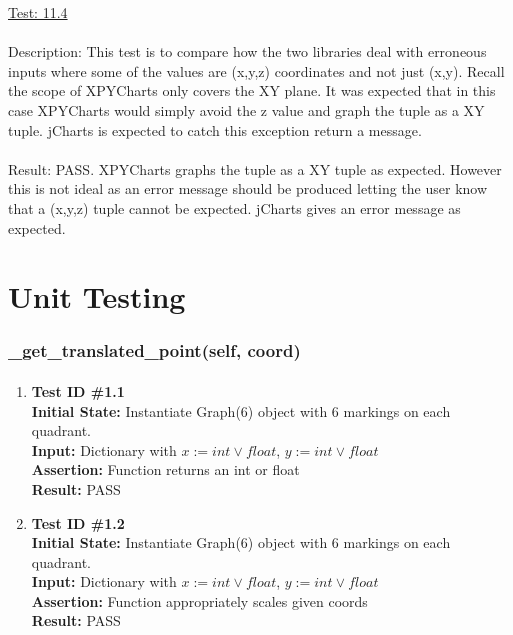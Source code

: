 \documentclass[12pt, titlepage]{article}
\begin{document}
\underline{Test: 11.4}\\\\\label{sec:11.4}
Description: This test is to compare how the two libraries deal with erroneous inputs where some of the values are (x,y,z) coordinates and not just (x,y). Recall the scope of XPYCharts only covers the XY plane. It was expected that in this case XPYCharts would simply avoid the z value and graph the tuple as a XY tuple. jCharts is expected to catch this exception return a message.\\\\

Result: PASS. XPYCharts graphs the tuple as a XY tuple as expected. However this is not ideal as an error message should be produced letting the user know that a (x,y,z) tuple cannot be expected. jCharts gives an error message as expected.\\

\section{Unit Testing}\label{sec:unittest}


\subsubsection{\_get\_translated\_point(self, coord)}		
	\label{sec:4.0.1}
	\paragraph{}
		\begin{enumerate}
			\item{\textbf{Test ID \#1.1\\}}
			\textbf{Initial State:} Instantiate Graph(6) object with 6 markings on each quadrant.\\
			\textbf{Input:} Dictionary with $x:= int \vee float$, $y:= int \vee float$ \\
			\textbf{Assertion:} Function returns an int or float \\
			\textbf{Result:} PASS
			
			\item{\textbf{Test ID \#1.2\\}}
			\textbf{Initial State:} Instantiate Graph(6) object with 6 markings on each quadrant.\\
			\textbf{Input:} Dictionary with $x:= int \vee float$, $y:= int \vee float$ \\
			\textbf{Assertion:} Function appropriately scales given coords \\
			\textbf{Result:} PASS
			
		\end{enumerate}
\end{document}
